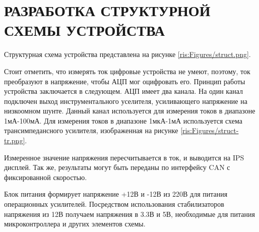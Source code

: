 \begin{sloppypar} %
\newpage %
\section{РАЗРАБОТКА СТРУКТУРНОЙ СХЕМЫ УСТРОЙСТВА} %
Структурная схема устройства представлена на рисунке \ref{ris:Figures/struct.png}.

Стоит отметить, что измерять ток цифровые устройства не умеют, поэтому, ток преобразуют в напряжение, чтобы АЦП мог оцифровать его. 
Принцип работы устройства заключается в следующем. АЦП имеет два канала. На один канал подключен выход инструментального уселителя, усиливающего напряжение на низкоомном шунте.  Данный канал используется для измерения токов в диапазоне 1мА-100мА. Для измерения токов в диапазоне 1мкА-1мА используется схема трансимпедансного усилителя\cite {CIRCUIT-CELLAR}, изображенная на рисунке \ref{ris:Figures/struct-tr.png}.

Измеренное значение напряжения пересчитывается в ток, и выводится на IPS дисплей. Так же, результаты могут быть переданы по интерфейсу CAN с фиксированной скоростью.

Блок питания формирует напряжение +12В и -12В из 220В для питания операционных усилителей. Посредством использования стабилизаторов напряжения из 12В получаем напряжения в 3.3В и 5В, необходимые для питания микроконтроллера и других элементов схемы.


\end{sloppypar}

